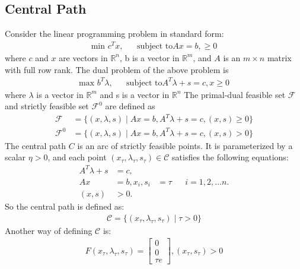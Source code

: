 \subsection*{Central Path}
Consider the linear programming problem in standard form:
\begin{equation*}
\begin{aligned}
\text{min } c^Tx, & & \text{subject to} Ax=b, \geqslant 0	
\end{aligned}
\end{equation*}
where $c$ and $x$ are vectors in $\mathbb{R}^n$, b is a vector in $\mathbb{R}^m$, and $A$ is an $m\times n$ matrix with full row rank. The dual problem of the above problem is
\begin{equation*}
\begin{aligned}
	\text{max } b^T\lambda, & & \text{subject to} A^T\lambda + s = c, x\geqslant 0
\end{aligned}
\end{equation*}
where $\lambda$ is a vector in $\mathbb{R}^m$ and s is a vector in $\mathbb{R}^n$
The primal-dual feasible set $\mathcal{F}$ and strictly feasible set $\mathcal{F}^0$ are defined as
\begin{equation*}
	\begin{aligned}
		\mathcal{F} &= \lbrace (x,\lambda,s) \mid Ax=b, A^T\lambda +s = c, (x,s) \geqslant0 \rbrace\\
		\mathcal{F}^0 &= \lbrace (x,\lambda,s) \mid Ax=b, A^T\lambda +s = c, (x,s) > 0 \rbrace
	\end{aligned}
\end{equation*}
The central path $C$ is an arc of strictly feasible points. It is parameterized by a scalar $\eta > 0$, and each point $(x_\tau ,\lambda_\tau, s_\tau)\in \mathcal{C}$ satisfies the following equations:
\begin{equation*}
	\begin{aligned}
		A^T\lambda+s &= c,\\
		Ax &= b,
		x_i,s_i &= \tau & & i = 1,2,...n.\\ 
		(x,s ) & > 0.
	\end{aligned}
\end{equation*}
So the central path is defined as:
\begin{equation*}
\begin{aligned}
	\mathcal{C} = \lbrace (x_\tau,\lambda_\tau, s_\tau)\mid \tau>0\rbrace
\end{aligned}
\end{equation*}
Another way of defining $\mathcal{C}$ is:
\begin{equation*}
\begin{aligned}
F(x_\tau,\lambda_\tau, s_\tau)=
	\begin{bmatrix}
		0\\
		0\\
		\tau e
	\end{bmatrix},
	(x_\tau,s_\tau) > 0
\end{aligned}
\end{equation*}

